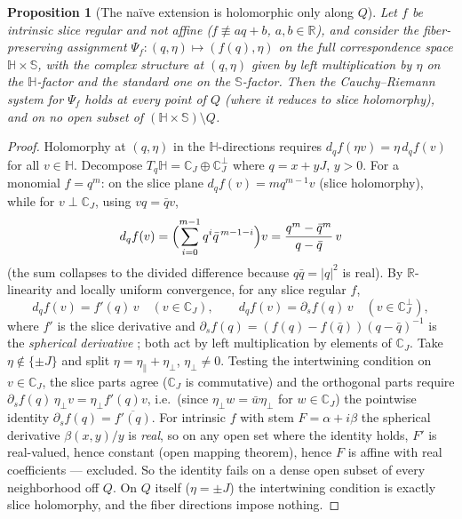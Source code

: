 \documentclass[11pt]{amsart}
\theoremstyle{plain}
\newtheorem{proposition}[theorem]{Proposition}
\theoremstyle{definition}
\theoremstyle{remark}
\newcommand{\HH}{\mathbb{H}}
\newcommand{\CC}{\mathbb{C}}
\newcommand{\RR}{\mathbb{R}}
\renewcommand{\SS}{\mathbb{S}}
\begin{document}
\begin{proposition}[The na\"ive extension is holomorphic only along $Q$]\label{prop:naive}
Let $f$ be intrinsic slice regular and not affine ($f\not\equiv aq+b$, $a,b\in\RR$), and consider
the fiber-preserving assignment $\Psi_f:(q,\eta)\mapsto(f(q),\eta)$ on the full correspondence
space $\HH\times\SS$, with the complex structure at $(q,\eta)$ given by left multiplication by
$\eta$ on the $\HH$-factor and the standard one on the $\SS$-factor. Then the Cauchy--Riemann
system for $\Psi_f$ holds at every point of $Q$ (where it reduces to slice holomorphy), and on no
open subset of $(\HH\times\SS)\setminus Q$.
\end{proposition}

\begin{proof}
Holomorphy at $(q,\eta)$ in the $\HH$-directions requires $d_qf(\eta v)=\eta\,d_qf(v)$ for all
$v\in\HH$. Decompose $T_q\HH=\CC_J\oplus\CC_J^\perp$ where $q=x+yJ$, $y>0$. For a monomial
$f=q^m$: on the slice plane $d_qf(v)=mq^{m-1}v$ (slice holomorphy), while for $v\perp\CC_J$,
using $vq=\bar qv$,
\[
d_qf(v)=\Bigl(\sum_{i=0}^{m-1}q^i\bar q^{\,m-1-i}\Bigr)v
=\frac{q^m-\bar q^m}{q-\bar q}\,v
\]
(the sum collapses to the divided difference because $q\bar q=|q|^2$ is real). By
$\RR$-linearity and locally uniform convergence, for any slice regular $f$,
\begin{equation}\label{eq:blocks}
d_qf(v)=f'(q)\,v \quad (v\in\CC_J),\qquad
d_qf(v)=\partial_s f(q)\,v \quad (v\in\CC_J^\perp),
\end{equation}
where $f'$ is the slice derivative and
$\partial_sf(q)=(f(q)-f(\bar q))(q-\bar q)^{-1}$ is the \emph{spherical derivative}
\cite{GhiloniPerotti2011,GSSbook}; both act by left multiplication by elements of $\CC_J$. Take
$\eta\notin\{\pm J\}$ and split $\eta=\eta_\parallel+\eta_\perp$, $\eta_\perp\neq0$. Testing the
intertwining condition on $v\in\CC_J$, the slice parts agree ($\CC_J$ is commutative) and the
orthogonal parts require $\partial_sf(q)\,\eta_\perp v=\eta_\perp f'(q)v$, i.e.\ (since
$\eta_\perp w=\bar w\eta_\perp$ for $w\in\CC_J$) the pointwise identity
$\partial_sf(q)=\overline{f'(q)}$. For intrinsic $f$ with stem $F=\alpha+i\beta$ the spherical
derivative $\beta(x,y)/y$ is \emph{real}, so on any open set where the identity holds, $F'$ is
real-valued, hence constant (open mapping theorem), hence $F$ is affine with real coefficients
--- excluded. So the identity fails on a dense open subset of every neighborhood off $Q$. On $Q$
itself ($\eta=\pm J$) the intertwining condition is exactly slice holomorphy, and the fiber
directions impose nothing.
\end{proof}
\end{document}
